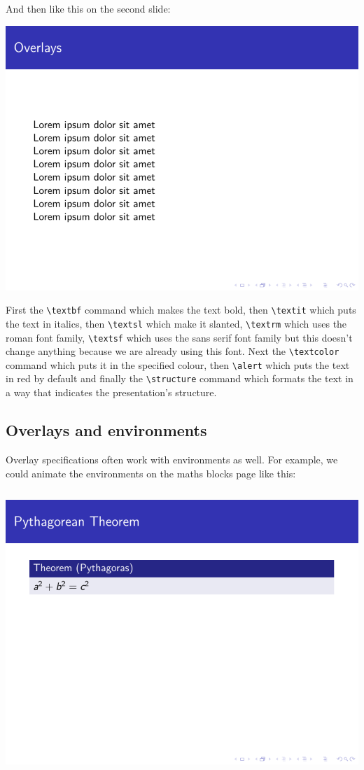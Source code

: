 \begin{column}{0.5\textwidth}
And then like this on the second slide:

\includegraphics[page=2]{examples/beamer/beameroverlay07.pdf}

First the \verb|\textbf| command which makes the text bold, then \verb|\textit| which puts the text in italics, then \verb|\textsl| which make it slanted, \verb|\textrm| which uses the roman font family, \verb|\textsf| which uses the sans serif font family but this doesn't change anything because we are already using this font. Next the \verb|\textcolor| command which puts it in the specified colour, then \verb|\alert| which puts the text in red by default and finally the \verb|\structure| command which formats the text in a way that indicates the presentation's structure.

\subsection{Overlays and environments}

Overlay specifications often work with environments as well. For example, we could animate the environments on the maths blocks page like this:

\inputminted[linenos=true]{latex}{examples/beamer/beameroverlay08.tex}

\includegraphics[page=1]{examples/beamer/beameroverlay08.pdf}


\end{column}
